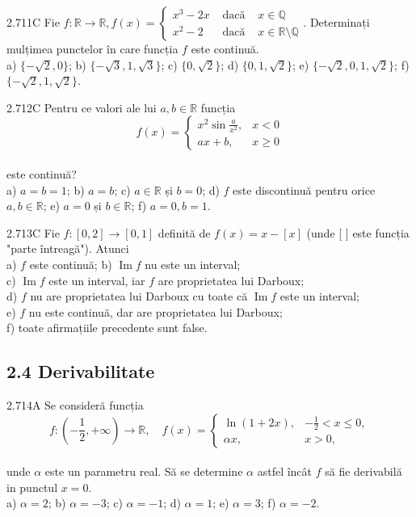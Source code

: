 \documentclass[11pt]{article}
\begin{document}
2.711C Fie $f: \mathbb{R} \rightarrow \mathbb{R}, f(x)=\left\{\begin{array}{lll}x^{3}-2 x & \text { dacă } & x \in \mathbb{Q} \\ x^{2}-2 & \text { dacă } & x \in \mathbb{R} \setminus \mathbb{Q}\end{array}\right.$. Determinați mulțimea punctelor în care funcția $f$ este continuă.\\ a) $\{-\sqrt{2}, 0\}$; b) $\{-\sqrt{3}, 1, \sqrt{3}\}$; c) $\{0, \sqrt{2}\}$; d) $\{0,1, \sqrt{2}\}$; e) $\{-\sqrt{2}, 0,1, \sqrt{2}\}$; f) $\{-\sqrt{2},1,\sqrt{2}\}$.

2.712C Pentru ce valori ale lui $a, b \in \mathbb{R}$ funcția $$f(x)= \begin{cases}x^{2} \sin \frac{a}{x^{2}}, & x<0 \\ a x+b, & x \geq 0\end{cases}$$\\este continuă?\\ a) $a=b=1$; b) $a=b$; c) $a \in \mathbb{R}$ și $b=0$; d) $f$ este discontinuă pentru orice $a, b \in \mathbb{R}$; e) $a=0$ și $b \in \mathbb{R}$; f) $a=0, b=1$.

2.713C Fie $f:[0,2] \rightarrow[0,1]$ definită de $f(x)=x-[x]$ (unde [ ] este funcția "parte întreagă"). Atunci\\ a) $f$ este continuă; b) $\operatorname{Im} f$ nu este un interval;\\ c) $\operatorname{Im} f$ este un interval, iar $f$ are proprietatea lui Darboux;\\ d) $f$ nu are proprietatea lui Darboux cu toate că $\operatorname{Im} f$ este un interval;\\ e) $f$ nu este continuă, dar are proprietatea lui Darboux;\\ f) toate afirmațiile precedente sunt false.

\subsection*{2.4 Derivabilitate}
2.714A Se consideră funcția $$f:\left(-\frac{1}{2},+\infty\right) \rightarrow \mathbb{R}, \quad f(x)= \begin{cases}\ln (1+2 x), & -\frac{1}{2}<x \leq 0, \\ \alpha x, & x>0,\end{cases}$$\\unde $\alpha$ este un parametru real. Să se determine $\alpha$ astfel încât $f$ să fie derivabilă in punctul $x=0$.\\ a) $\alpha=2$; b) $\alpha=-3$; c) $\alpha=-1$; d) $\alpha=1$; e) $\alpha=3$; f) $\alpha=-2$.
\end{document}

